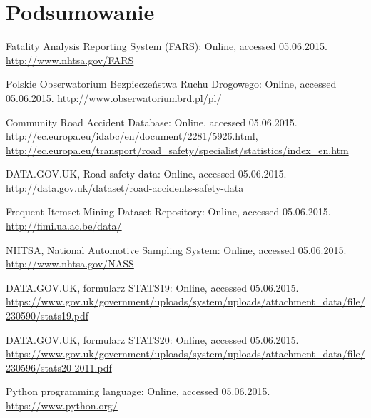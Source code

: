 \documentclass[12pt]{aghdpl}
\begin{document}
\chapter{Podsumowanie}


\begin{thebibliography}{99}

Fatality Analysis Reporting System (FARS): Online, accessed 05.06.2015. \href{http://www.nhtsa.gov/FARS}{http://www.nhtsa.gov/FARS}

Polskie Obserwatorium Bezpieczeństwa Ruchu Drogowego: Online, accessed 05.06.2015. \href{http://www.obserwatoriumbrd.pl/pl/}{http://www.obserwatoriumbrd.pl/pl/}

Community Road Accident Database: Online, accessed 05.06.2015. \href{http://ec.europa.eu/idabc/en/document/2281/5926.html}{http://ec.europa.eu/idabc/en/document/2281/5926.html}, \\ \href{http://ec.europa.eu/transport/road_safety/specialist/statistics/index_en.htm}{http://ec.europa.eu/transport/road\_safety/specialist/statistics/index\_en.htm}

DATA.GOV.UK, Road safety data: Online, accessed 05.06.2015. \href{http://data.gov.uk/dataset/road-accidents-safety-data}{http://data.gov.uk/dataset/road-accidents-safety-data}

Frequent Itemset Mining Dataset Repository: Online, accessed 05.06.2015. \href{http://fimi.ua.ac.be/data/}{http://fimi.ua.ac.be/data/}

NHTSA, National Automotive Sampling System: Online, accessed 05.06.2015. \href{http://www.nhtsa.gov/NASS}{http://www.nhtsa.gov/NASS}

DATA.GOV.UK, formularz STATS19: Online, accessed 05.06.2015. \href{https://www.gov.uk/government/uploads/system/uploads/attachment_data/file/230590/stats19.pdf}{https://www.gov.uk/government/uploads/system/uploads/attachment\_data/file/230590/stats19.pdf}


DATA.GOV.UK, formularz STATS20: Online, accessed 05.06.2015. \href{https://www.gov.uk/government/uploads/system/uploads/attachment_data/file/230596/stats20-2011.pdf}{https://www.gov.uk/government/uploads/system/uploads/attachment\_data/file/230596/stats20-2011.pdf}

Python programming language: Online, accessed 05.06.2015. \href{https://www.python.org/}{https://www.python.org/}


\end{thebibliography}
\end{document}
